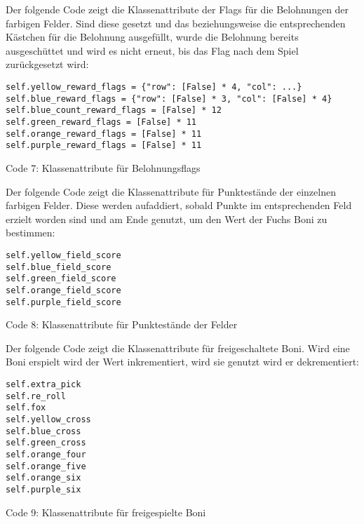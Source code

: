 \begin{minipage}{\linewidth}
Der folgende Code zeigt die Klassenattribute der Flags für die Belohnungen der farbigen Felder. Sind diese gesetzt und das beziehungsweise die entsprechenden Kästchen für die Belohnung ausgefüllt, wurde die Belohnung bereits ausgeschüttet und wird es nicht erneut, bis das Flag nach dem Spiel zurückgesetzt wird:
\vspace{0.5cm}
\begin{lstlisting}
self.yellow_reward_flags = {"row": [False] * 4, "col": ...}
self.blue_reward_flags = {"row": [False] * 3, "col": [False] * 4}
self.blue_count_reward_flags = [False] * 12
self.green_reward_flags = [False] * 11
self.orange_reward_flags = [False] * 11
self.purple_reward_flags = [False] * 11
\end{lstlisting}
Code 7: Klassenattribute für Belohnungsflags\\
\end{minipage}

\begin{minipage}{\linewidth}
Der folgende Code zeigt die Klassenattribute für Punktestände der einzelnen farbigen Felder. Diese werden aufaddiert, sobald Punkte im entsprechenden Feld erzielt worden sind und am Ende genutzt, um den Wert der Fuchs Boni zu bestimmen:
\vspace{0.5cm}
\begin{lstlisting}
self.yellow_field_score
self.blue_field_score
self.green_field_score
self.orange_field_score
self.purple_field_score
\end{lstlisting}
Code 8: Klassenattribute für Punktestände der Felder\\
\end{minipage}

\begin{minipage}{\linewidth}
Der folgende Code zeigt die Klassenattribute für freigeschaltete Boni. Wird eine Boni erspielt wird der Wert inkrementiert, wird sie genutzt wird er dekrementiert:
\vspace{0.5cm}
\begin{lstlisting}
self.extra_pick
self.re_roll
self.fox
self.yellow_cross
self.blue_cross
self.green_cross
self.orange_four
self.orange_five
self.orange_six
self.purple_six
\end{lstlisting}
Code 9: Klassenattribute für freigespielte Boni\\
\end{minipage}

